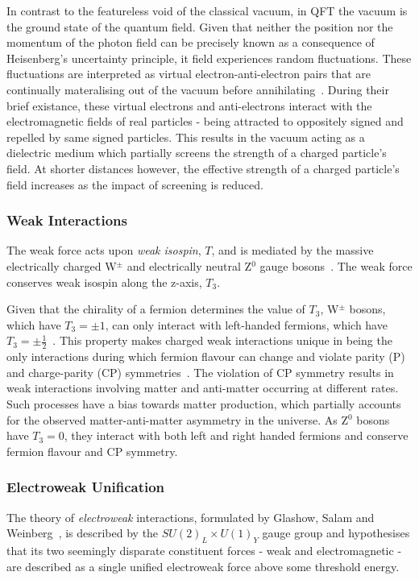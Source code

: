 In contrast to the featureless void of the classical vacuum, in QFT the vacuum is the ground state of the quantum field.
Given that neither the position nor the momentum of the photon field can be precisely known as a consequence of Heisenberg's uncertainty principle, it field experiences random fluctuations.
These fluctuations are interpreted as virtual electron-anti-electron pairs that are continually materalising out of the vacuum before annihilating~\cite{coughlan2006ideas}.
During their brief existance, these virtual electrons and anti-electrons interact with the electromagnetic fields of real particles - being attracted to oppositely signed and repelled by same signed particles.
This results in the vacuum acting as a dielectric medium which partially screens the strength of a charged particle's field.
At shorter distances however, the effective strength of a charged particle's field increases as the impact of screening is reduced.

\subsubsection{Weak Interactions}\label{subsec:weakForce}
The weak force acts upon \emph{weak isospin}, $T$, and is mediated by the massive electrically charged W$^{\pm}$ and electrically neutral Z$^{0}$ gauge bosons~\cite{ElectroweakStrong}.
The weak force conserves weak isospin along the z-axis, $T_{3}$.

Given that the chirality of a fermion determines the value of $T_{3}$, W$^{\pm}$ bosons, which have $T_{3} = \pm 1$, can only interact with left-handed fermions, which have $T_{3} = \pm \frac{1}{2}$~\cite{Cheng:1985bj}.
This property makes charged weak interactions unique in being the only interactions during which fermion flavour can change and violate parity (P)~\cite{Lee:1956qn,Wu:1957my} and charge-parity (CP) symmetries~\cite{Christenson:1964fg}.
The violation of CP symmetry results in weak interactions involving matter and anti-matter occurring at different rates.
Such processes have a bias towards matter production, which partially accounts for the observed matter-anti-matter asymmetry in the universe.
As Z$^{0}$ bosons have $T_{3} = 0$, they interact with both left and right handed fermions and conserve fermion flavour and CP symmetry.

\subsubsection{Electroweak Unification}\label{subsec:electroweak}
The theory of \emph{electroweak} interactions, formulated by Glashow, Salam and Weinberg~\cite{Glashow:1961tr,Salam:1964ry,Weinberg:1967tq}, is described by the $SU(2)_{L} \times U(1)_{Y}$ gauge group and hypothesises that its two seemingly disparate constituent forces - weak and electromagnetic - are described as a single unified electroweak force above some threshold energy.


